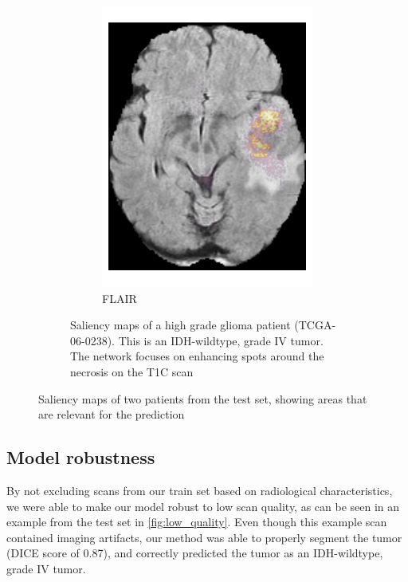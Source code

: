 \begin{figure}[htbp]
\begin{subfigure}[b]{\textwidth}
\begin{subfigure}[b]{0.24\textwidth}
        \includegraphics[width=\textwidth]{Figures/saliency_HGG_FLAIR.png}
        \caption*{\acrshort{FLAIR}\nopunct}
        \end{subfigure}
        \caption{Saliency maps of a high grade glioma patient (TCGA-06-0238). This is an \acrshort{IDH}-wildtype, grade IV \gls{tumor}.
        The network focuses on enhancing spots around the necrosis on the \gls{T1C} scan}\label{fig:saliency_HGG}
    \end{subfigure}

\caption{Saliency maps of two patients from the test set, showing areas that are relevant for the prediction}\label{fig:saliency_maps}
\end{figure}

\subsection{Model robustness}

By not excluding scans from our train set based on radiological characteristics, we were able to make our model robust to low scan quality, as can be seen in an example from the test set in \cref{fig:low_quality}.
Even though this example scan contained imaging artifacts, our method was able to properly segment the \gls{tumor} (DICE score of 0.87), and correctly predicted the \gls{tumor} as an \acrshort{IDH}-wildtype, grade IV \gls{tumor}.

